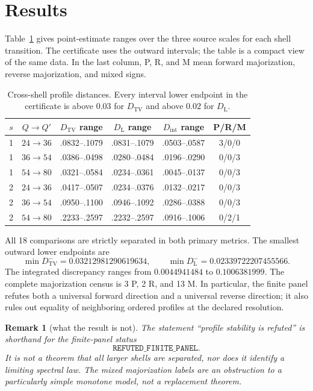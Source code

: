 \documentclass[10pt]{article}
\newtheorem{remark}{Remark}
\newcommand{\TV}{D_{\mathrm{TV}}}
\newcommand{\DL}{D_{\mathrm{L}}}
\newcommand{\DI}{D_{\mathrm{int}}}
\begin{document}
\section{Results}

Table~\ref{tab:distances} gives point-estimate ranges over the three source
scales for each shell transition.  The certificate uses the outward intervals;
the table is a compact view of the same data.  In the last column, P, R, and M
mean forward majorization, reverse majorization, and mixed signs.

\begin{table}[t]
\centering
\small
\caption{Cross-shell profile distances.  Every interval lower endpoint in the
certificate is above $0.03$ for $\TV$ and above $0.02$ for $\DL$.}
\label{tab:distances}
\begin{tabular}{c c c c c c}
\toprule
$s$ & $Q\to Q'$ & $\TV$ range & $\DL$ range & $\DI$ range & P/R/M\\
\midrule
1 & $24\to36$ & .0832--.1079 & .0831--.1079 & .0503--.0587 & 3/0/0\\
1 & $36\to54$ & .0386--.0498 & .0280--.0484 & .0196--.0290 & 0/0/3\\
1 & $54\to80$ & .0321--.0584 & .0234--.0361 & .0045--.0137 & 0/0/3\\
2 & $24\to36$ & .0417--.0507 & .0234--.0376 & .0132--.0217 & 0/0/3\\
2 & $36\to54$ & .0950--.1100 & .0946--.1092 & .0286--.0388 & 0/0/3\\
2 & $54\to80$ & .2233--.2597 & .2232--.2597 & .0916--.1006 & 0/2/1\\
\bottomrule
\end{tabular}
\end{table}

All 18 comparisons are strictly separated in both primary metrics.  The
smallest outward lower endpoints are
\[
 \min\TV^- =0.03212981290619634,\qquad
 \min\DL^- =0.02339722207455566.
\]
The integrated discrepancy ranges from $0.0044941484$ to $0.1006381999$.
The complete majorization census is 3 P, 2 R, and 13 M.  In particular, the
finite panel refutes both a universal forward direction and a universal
reverse direction; it also rules out equality of neighboring ordered
profiles at the declared resolution.

\begin{remark}[what the result is not]
The statement ``profile stability is refuted'' is shorthand for
the finite-panel status
\[
\texttt{REFUTED\_FINITE\_PANEL}.
\]
It is not a theorem that all larger shells
are separated, nor does it identify a limiting spectral law.  The mixed
majorization labels are an obstruction to a particularly simple monotone
model, not a replacement theorem.
\end{remark}
\end{document}
